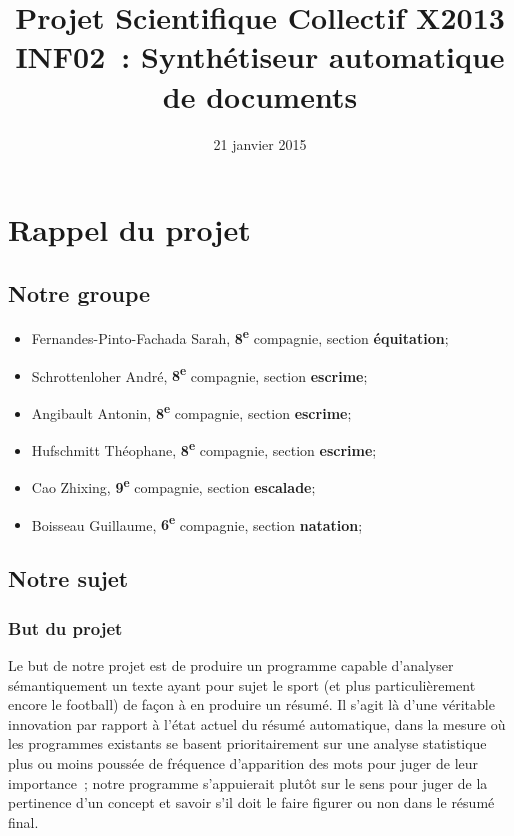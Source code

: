 \documentclass[a4paper, 12pt]{article}
\title{Projet Scientifique Collectif X2013 \\INF02~: Synthétiseur automatique de documents}
\author{\membres} %
\date{21 janvier 2015}
\begin{document}
\titrelong{}


\tableofcontents
\newpage

\section{Rappel du projet}

\subsection{Notre groupe}
\begin{itemize}
 \item Fernandes-Pinto-Fachada Sarah, \textbf{8\textsuperscript{e}} compagnie, section \textbf{équitation};
 \item Schrottenloher André, \textbf{8\textsuperscript{e}} compagnie, section \textbf{escrime};
 \item Angibault Antonin, \textbf{8\textsuperscript{e}} compagnie, section \textbf{escrime};
 \item Hufschmitt Théophane, \textbf{8\textsuperscript{e}} compagnie, section \textbf{escrime};
 \item Cao Zhixing, \textbf{9\textsuperscript{e}} compagnie, section \textbf{escalade};
 \item Boisseau Guillaume, \textbf{6\textsuperscript{e}} compagnie, section \textbf{natation};
\end{itemize}

\subsection{Notre sujet}

\subsubsection{But du projet}

Le but de notre projet est de produire un programme capable d'analyser sémantiquement un texte ayant pour sujet le sport (et plus particulièrement encore le football) de façon à en produire un résumé. Il s'agit là d'une véritable innovation par rapport à l'état actuel du résumé automatique, dans la mesure où les programmes existants se basent prioritairement sur une analyse statistique plus ou moins poussée de fréquence d'apparition des mots pour juger de leur importance~; notre programme s'appuierait plutôt sur le sens pour juger de la pertinence d'un concept et savoir s'il doit le faire figurer ou non dans le résumé final.
\end{document}
